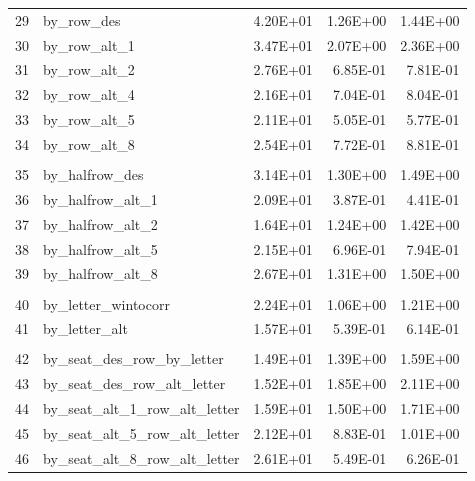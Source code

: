 \documentclass[11pt]{article}
\begin{document}
\begin{table}[htbp]
\begin{tabular}{rlrrr}
    \end{tabular}%

  \label{tab:fig1}%
\end{table}%
\begin{table}[t]
	\centering
	\begin{tabular}{rlrrr}
		29    & by\_row\_des & 4.20E+01 & 1.26E+00 & 1.44E+00 \\
		30    & by\_row\_alt\_1 & 3.47E+01 & 2.07E+00 & 2.36E+00 \\
		31    & by\_row\_alt\_2 & 2.76E+01 & 6.85E-01 & 7.81E-01 \\
		32    & by\_row\_alt\_4 & 2.16E+01 & 7.04E-01 & 8.04E-01 \\
		33    & by\_row\_alt\_5 & 2.11E+01 & 5.05E-01 & 5.77E-01 \\
		34    & by\_row\_alt\_8 & 2.54E+01 & 7.72E-01 & 8.81E-01 \\
		    &       &       &       &  \\
		 35    & by\_halfrow\_des & 3.14E+01 & 1.30E+00 & 1.49E+00 \\
		36    & by\_halfrow\_alt\_1 & 2.09E+01 & 3.87E-01 & 4.41E-01 \\
		37    & by\_halfrow\_alt\_2 & 1.64E+01 & 1.24E+00 & 1.42E+00 \\
		38    & by\_halfrow\_alt\_5 & 2.15E+01 & 6.96E-01 & 7.94E-01 \\
		39    & by\_halfrow\_alt\_8 & 2.67E+01 & 1.31E+00 & 1.50E+00 \\
		&       &       &       &  \\
		40    & by\_letter\_wintocorr & 2.24E+01 & 1.06E+00 & 1.21E+00 \\
		41    & by\_letter\_alt & 1.57E+01 & 5.39E-01 & 6.14E-01 \\
		&       &       &       &  \\
		42    & by\_seat\_des\_row\_by\_letter & 1.49E+01 & 1.39E+00 & 1.59E+00 \\
		43    & by\_seat\_des\_row\_alt\_letter & 1.52E+01 & 1.85E+00 & 2.11E+00 \\
		44    & by\_seat\_alt\_1\_row\_alt\_letter & 1.59E+01 & 1.50E+00 & 1.71E+00 \\
		45    & by\_seat\_alt\_5\_row\_alt\_letter & 2.12E+01 & 8.83E-01 & 1.01E+00 \\
		46    & by\_seat\_alt\_8\_row\_alt\_letter & 2.61E+01 & 5.49E-01 & 6.26E-01 \\
	\end{tabular}
\end{table}


		
\end{document}
